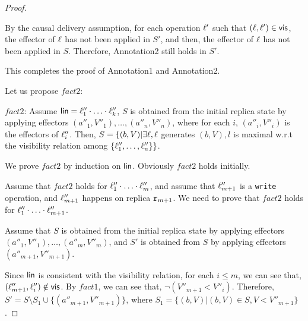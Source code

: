 \begin {proof}
\begin{itemize}
    By the causal delivery assumption, for each operation $\ell'$ such that $(\ell,\ell') \in \mathsf{vis}$, the effector of $\ell$ has not been applied in $S'$, and then, the effector of $\ell$ has not been applied in $S$. Therefore, Annotation2 still holds in $S'$. %

\end{itemize}

This completes the proof of Annotation1 and Annotation2.


Let us propose $fact2$:

\noindent $fact2$: Assume $\mathsf{lin} = \ell''_1 \cdot \ldots \cdot \ell''_k$, $S$ is obtained from the initial replica state by applying effectors $(a''_1,V''_1),\ldots,(a''_n,V''_n)$, where for each $i$, $(a''_i,V''_i)$ is the effectors of $\ell''_i$. Then, $S = \{ (b,V) \vert \exists \ell, \ell$ generates $(b,V), l$ is maximal w.r.t the visibility relation among $ \{ \ell''_1,\ldots,\ell''_n \} \}$.



We prove $fact2$ by induction on $\mathsf{lin}$. Obviously $fact2$ holds initially.

Assume that $fact2$ holds for $\ell''_1 \cdot \ldots \cdot \ell''_m$, and assume that $\ell''_{m+1}$ is a {\tt write} operation, and $\ell''_{m+1}$ happens on replica $\mathtt{r}_{m+1}$. We need to prove that $fact2$ holds for $\ell''_1 \cdot \ldots \cdot \ell''_{m+1}$.

Assume that $S$ is obtained from the initial replica state by applying effectors $(a''_1,V''_1),\ldots,(a''_m,V''_m)$, and $S'$ is obtained from $S$ by applying effectors $(a''_{m+1}, V''_{m+1})$.

Since $\mathsf{lin}$ is consistent with the visibility relation, for each $i \leq m$, we can see that, $(\ell''_{m+1},\ell''_i) \notin \mathsf{vis}$. By $fact1$, we can see that, $\neg (V''_{m+1} < V''_i)$. Therefore, $S' = S \setminus S_1 \cup \{ (a''_{m+1},V''_{m+1}) \}$, where $S_1 = \{ (b,V) \vert (b,V) \in S, V < V''_{m+1} \}$.


\end{proof}

